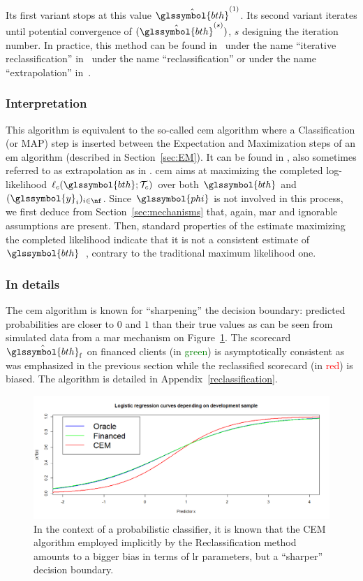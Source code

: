 Its first variant stops at this value $\hat{\glssymbol{bth}}^{(1)}$. Its second variant iterates until potential convergence of $(\hat{\glssymbol{bth}}^{(s)})$, $s$ designing the iteration number. In practice, this method can be found in~\cite{saporta} under the name ``iterative reclassification'' in~\cite{RI6}  under the name ``reclassification'' or under the name ``extrapolation'' in~\cite{banasik}.

\subsubsection{Interpretation}
This algorithm is equivalent to the so-called \gls{cem} algorithm where a Classification (or MAP) step is inserted between the Expectation and Maximization steps of an \gls{em} algorithm (described in Section~\ref{sec:EM}). It can be found in \cite{RI6}, also sometimes referred to as extrapolation as in \cite{banasik}. \gls{cem} aims at maximizing the completed log-likelihood $\ell_c(\glssymbol{bth};\mathcal{T}_c)$ over both $\glssymbol{bth}$ and $(\glssymbol{y}_i)_{i \in \nf}$. Since $\glssymbol{phi}$ is not involved in this process, we first deduce from Section~\ref{sec:mechanisms} that, again, \gls{mar} and ignorable assumptions are present. Then, standard properties of the estimate maximizing the completed likelihood indicate that it is not a consistent estimate of $\glssymbol{bth}$~\cite{celeux1992classification}, contrary to the traditional maximum likelihood one.

\subsubsection{In details}
The \gls{cem} algorithm is known for ``sharpening'' the decision boundary: predicted probabilities are closer to $0$ and $1$ than their true values as can be seen from simulated data from a \gls{mar} mechanism on Figure~\ref{fig:biais_CEM}. The scorecard $\hat{\glssymbol{bth}}_{\text{f}}$ on financed clients (in \textcolor{green}{green}) is asymptotically consistent as was emphasized in the previous section while the reclassified scorecard (in \textcolor{red}{red}) is biased. The algorithm is detailed in Appendix~\ref{reclassification}.

\begin{figure}[ht]
\center \includegraphics[width=\textwidth]{figures/chapitre2/CEM_bias.png}
\caption{In the context of a probabilistic classifier, it is known that the CEM algorithm employed implicitly by the Reclassification method amounts to a bigger bias in terms of \gls{lr} parameters, but a ``sharper'' decision boundary.}
\label{fig:biais_CEM}
\end{figure}


